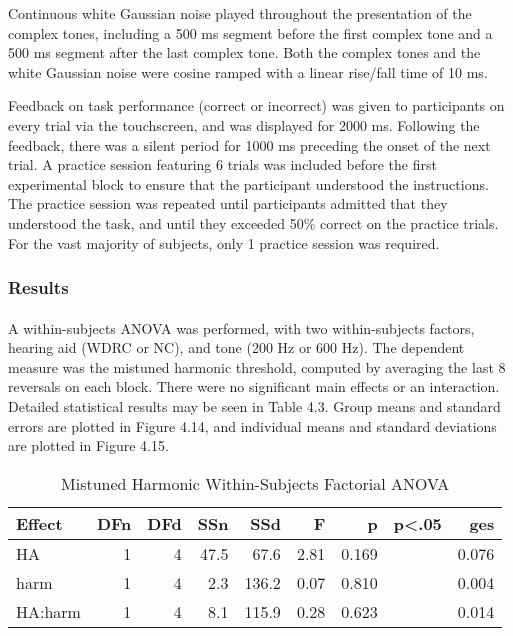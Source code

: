 Continuous white Gaussian noise played throughout the presentation of the complex tones, including a 500 ms segment before the first complex tone and a 500 ms segment after the last complex tone.  Both the complex tones and the white Gaussian noise were cosine ramped with a linear rise/fall time of 10 ms.

Feedback on task performance (correct or incorrect) was given to participants on every trial via the touchscreen, and was displayed for 2000 ms.  Following the feedback, there was a silent period for 1000 ms preceding the onset of the next trial.  A practice session featuring 6 trials was included before the first experimental block to ensure that the participant understood the instructions.  The practice session was repeated until participants admitted that they understood the task, and until they exceeded 50\% correct on the practice trials.  For the vast majority of subjects, only 1 practice session was required.
\subsubsection{Results}
\paragraph{}A within-subjects ANOVA was performed, with two within-subjects factors, hearing aid (WDRC or NC), and tone (200 Hz or 600 Hz).  The dependent measure was the mistuned harmonic threshold, computed by averaging the last 8 reversals on each block.  There were no significant main effects or an interaction.  Detailed statistical results may be seen in Table 4.3.  Group means and standard errors are plotted in Figure 4.14, and individual means and standard deviations are plotted in Figure 4.15.

\begin{table}[htp]
\begin{center}
\begin{tabular}{lrrrrrrrr}
       Effect & DFn & DFd  &  SSn &  SSd  &    F  &     p & p<.05  &   ges \\
       \hline
          HA &  1 &  4 & 47.5 & 67.6 &  2.81 & 0.169 &   &   0.076 \\
        harm &  1  & 4 &  2.3 & 136.2 & 0.07 & 0.810 &   &   0.004 \\
     HA:harm &  1 &  4 &  8.1 & 115.9 & 0.28 & 0.623 &   &   0.014 \\
     \hline
\end{tabular}
\end{center}
\caption{Mistuned Harmonic Within-Subjects Factorial ANOVA}
\end{table}

